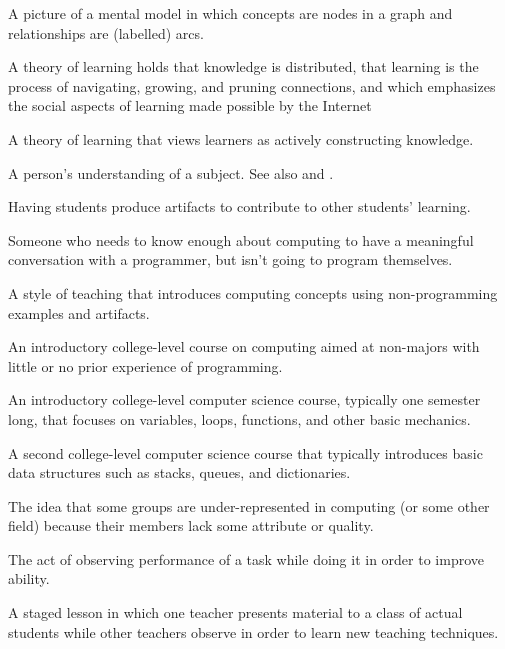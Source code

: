\begin{description}
 A picture of a mental model in which
concepts are nodes in a graph and relationships are (labelled) arcs.

 A theory of learning holds that knowledge
is distributed, that learning is the process of navigating, growing, and pruning
connections, and which emphasizes the social aspects of learning made possible
by the Internet

 A theory of learning that views
learners as actively constructing knowledge.

 A person's understanding of a
subject. See also
and .

 Having students
produce artifacts to contribute to other students' learning.

 Someone who
needs to know enough about computing to have a meaningful conversation with a
programmer, but isn't going to program themselves.

 A style of teaching that introduces
computing concepts using non-programming examples and artifacts.

 An introductory college-level course on computing aimed at
non-majors with little or no prior experience of programming.

 An introductory college-level computer science course,
typically one semester long, that focuses on variables, loops, functions, and
other basic mechanics.

 A second college-level computer science course that
typically introduces basic data structures such as stacks, queues, and
dictionaries.

 The idea that some groups are
under-represented in computing (or some other field) because their members lack
some attribute or quality.

 The act of observing
performance of a task while doing it in order to improve ability.

 A staged lesson in which
one teacher presents material to a class of actual students while other teachers
observe in order to learn new teaching techniques.


\end{description}
